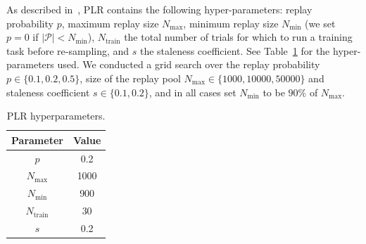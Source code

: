 \documentclass[11pt, a4paper, logo, copyright]{deepmind}
\begin{document}
\begin{appendix}
As described in~\citet{jiang2021robustplr, jiang2020prioritized}, PLR contains the following hyper-parameters: replay probability $p$, maximum replay size $N_{\textrm{max}}$, minimum replay size $N_{\textrm{min}}$ (we set $p = 0$ if $|\mathcal{P}| < N_{\textrm{min}}$), $N_{\textrm{train}}$ the total number of trials for which to run a training task before re-sampling, and $s$ the staleness coefficient. See Table~\ref{tab:plr_hyperparameters} for the hyper-parameters used. We conducted a grid search over the replay probability $p\in\{0.1,0.2,0.5\}$, size of the replay pool $N_{\textrm{max}} \in \{1000, 10000, 50000\}$ and staleness coefficient $s\in\{0.1,0.2\}$, and in all cases set $N_{\textrm{min}}$ to be $90\%$ of $N_{\textrm{max}}$.
\begin{table}[h!]
    \centering
    \caption{PLR hyperparameters.}
    \begin{tabular}{c|c}
         Parameter & Value \\ \hline
         $p$ & 0.2 \\
         $N_{\textrm{max}}$ & 1000 \\
         $N_{\textrm{min}}$ & 900 \\
         $N_{\textrm{train}}$ & 30 \\
         $s$ & 0.2
    \end{tabular}
    \label{tab:plr_hyperparameters}
\end{table}

\end{appendix}
\end{document}
